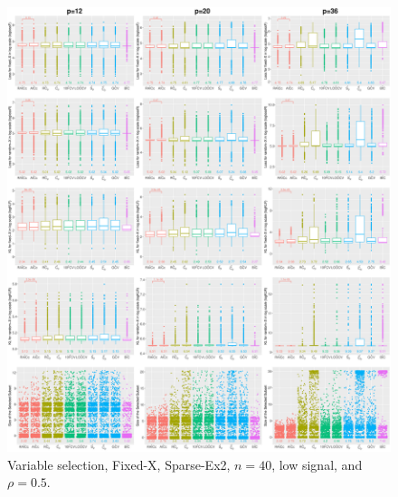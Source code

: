 \begin{figure}[!ht]
\centering
\includegraphics[width=\textwidth]{figures/supplement/fixedx/subset_selection/Sparse-Ex2_n40_lsnr_rho05.eps}
\caption{Variable selection, Fixed-X, Sparse-Ex2, $n=40$, low signal, and $\rho=0.5$.}
\end{figure}
\clearpage
